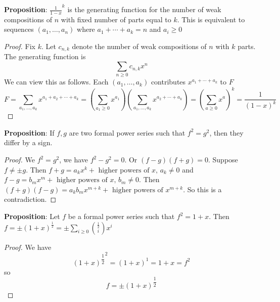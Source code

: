 \documentclass{report}
\begin{document}
\textbf{Proposition}: $\frac{1}{1 - x}^{k}$ is the generating function for the number of weak compositions of $n$ with fixed number of parts equal to $k$. This is equivalent to sequences $(a_{1}, \ldots , a_{n})$ where $a_{1} + \cdots +a_{k} = n$ and $a_{i} \geq 0$
    \begin{proof}
        Fix $k$. Let $c_{n, k}$ denote the number of weak compositions of $n$ with $k$ parts. The generating function is 
            \begin{equation*}
                \sum_{n \geq 0}c_{n, k}x^{n}
            \end{equation*}
        We can view this as follows. Each $(a_{1}, \ldots , a_{k})$ contributes $x^{a_{1} + \cdots +a_{k}}$ to $F$
            \begin{equation*}
                F = \sum_{a_{1}, \ldots , a_{k}}x^{a_{1} + a_{2} + \cdots  +a_{k}} = \left(\sum_{a_{1} \geq 0}x^{ a_{1}} \right)\left(\sum_{a_{1}, \ldots , a_{k}}x^{a_{2} + \cdots +a_{k}}\right) = \left(\sum_{a \geq 0}x^{a}\right)^{k} = \dfrac{1}{(1 - x)^{k}}
            \end{equation*}
    \end{proof}

\textbf{Proposition}: If $f, g$ are two formal power series such that $f^{2} = g^{2}$, then they differ by a sign.
    \begin{proof}
        We $f^{2} = g^{2}$, we have $f^{2} - g^{2} = 0$. Or $(f - g)(f + g) = 0$. Suppose $f \neq \pm g$. Then $f + g = a_{k}x^{k} + \text{ higher powers of $x$, $a_{k} \neq 0$}$ and $f - g = b_{m}x^{m} + \text{ higher powers of $x$, $b_{m} \neq 0$}$. Then $(f + g)(f - g) = a_{k}b_{m} x^{m + k} + \text{ higher powers of $x^{m + k}$}$. So this is a contradiction.
    \end{proof}

\textbf{Proposition}: Let $f$ be a formal power series such that $f^{2} = 1 + x$. Then $f = \pm \boxed{(1 + x)^{\frac{1}{2}}} = \pm \sum_{i \geq 0}\binom{\frac{1}{2}}{i}x^{i}$
    \begin{proof}
        We have
            \begin{equation*}
                \boxed{(1 + x)^{\dfrac{1}{2}}}^{2} = \boxed{(1 + x)^{1}} = 1 + x = f^{2}
            \end{equation*}
        so
            \begin{equation*}
                f = \pm \boxed{(1 + x)^{\dfrac{1}{2}}}
            \end{equation*}
    \end{proof}
\end{document}

